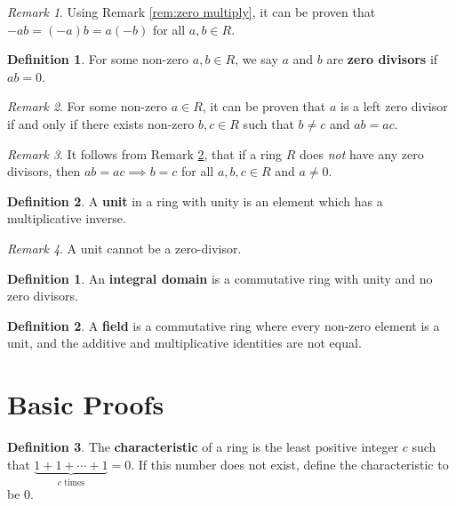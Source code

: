 \documentclass[
    parskip=half,
    toc=flat,
    toc=sectionentrydotfill,
]{scrartcl}  %
\theoremstyle{definition}
\newtheorem{definition}{Definition}[section]
\newtheorem{subdefinition}{Definition}[definition]
\theoremstyle{plain}
\theoremstyle{remark}
\newtheorem{remark}{Remark}[definition]
\begin{document}
\begin{remark}
    Using Remark \ref{rem:zero multiply}, it can be proven that
    $-ab=(-a)b=a(-b)$ for all $a,b\in R$.
\end{remark}

\begin{subdefinition}
    For some non-zero $a,b\in R$, we say $a$ and $b$ are \textbf{zero divisors}
    if $ab=0$.
\end{subdefinition}

\begin{remark}
    \label{rem:zero divisor}
    For some non-zero $a\in R$, it can be proven that $a$ is a left zero
    divisor if and only if there exists non-zero $b,c\in R$ such that $b\neq c$
    and $ab=ac$.
\end{remark}

\begin{remark}
    It follows from Remark \ref{rem:zero divisor}, that if a ring $R$ does
    \textit{not} have any zero divisors, then $ab=ac\implies b=c$ for all
    $a,b,c\in R$ and $a\neq 0$.
\end{remark}

\begin{subdefinition}
    A \textbf{unit} in a ring with unity is an element which has a
    multiplicative inverse.
\end{subdefinition}

\begin{remark}
    A unit cannot be a zero-divisor.
\end{remark}

\begin{definition}
    An \textbf{integral domain} is a commutative ring with unity and no zero
    divisors.
\end{definition}

\begin{definition}
    A \textbf{field} is a commutative ring where every non-zero element is a
    unit, and the additive and multiplicative identities are not equal.
\end{definition}


\section{Basic Proofs}


\begin{definition}
    The \textbf{characteristic} of a ring is the least positive integer $c$
    such that $\underbrace{1+1+\cdots+1}_{c\text{ times}}=0$.
    If this number does not exist, define the characteristic to be 0.
\end{definition}
\end{document}
